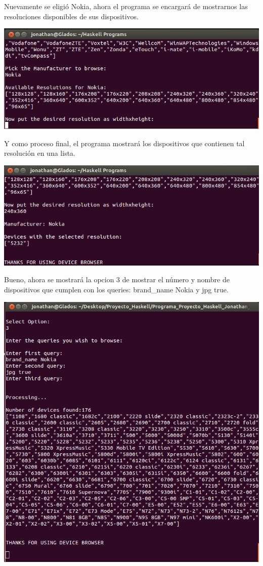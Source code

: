 \documentclass[11pt]{article} %
\begin{document}
Nuevamente se eligió Nokia, ahora el programa se encargará de mostrarnos las resoluciones disponibles de sus dispositivos.
\begin{center}
\includegraphics[scale=0.4]{screens/haskell6.png}
\end{center}
Y como proceso final, el programa mostrará los dispositivos que contienen tal resolución en una lista.
\begin{center}
\includegraphics[scale=0.4]{screens/haskell7.png}
\end{center}
Bueno, ahora se mostrará la opcion 3 de mostrar el número y nombre de dispositivos que cumplen con los queries: brand\_name Nokia y  jpg true.
\begin{center}
\includegraphics[scale=0.4]{screens/haskell8.png}
\end{center}
\end{document}
